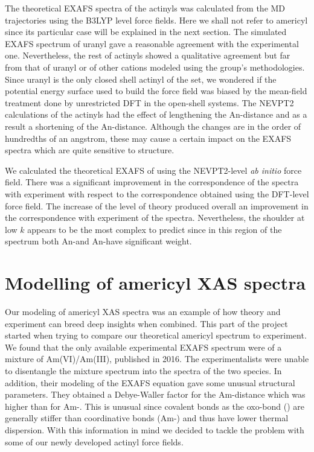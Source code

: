 The theoretical EXAFS spectra of the actinyls was calculated from the MD trajectories using the 
B3LYP level force fields. Here we shall not refer to americyl since its particular case will be 
explained in the next section. The simulated EXAFS spectrum of uranyl gave a reasonable agreement 
with the 
experimental one. Nevertheless, the rest of actinyls showed a qualitative agreement but far 
from that of 
uranyl or of other cations modeled using the group's methodologies. Since uranyl is the only closed 
shell actinyl of the set, we wondered if the potential energy surface used to build the force field 
was biased by the mean-field treatment done by unrestricted DFT in the open-shell systems. The 
NEVPT2 calculations of the actinyls had the effect of lengthening the An-\oyl distance and as a 
result a shortening of the An-\ofs distance. Although the changes are in the order of hundredths of 
an angstrom, these may cause a certain impact on the EXAFS spectra which are quite sensitive to 
structure. 

We calculated the theoretical EXAFS of \ce{[NpO2]^{+}} using the NEVPT2-level \textit{ab initio} 
force field. There was a significant improvement in the correspondence of the spectra with 
experiment with respect to the correspondence obtained using the DFT-level force field. The 
increase of the level of theory produced overall an improvement in the correspondence with 
experiment of the spectra. Nevertheless, the shoulder at low $k$ appears to be the most 
complex to predict since in this region of the spectrum both An-\oyl and An-\ofs have 
significant weight.

\section[Modelling of americyl XAS spectra]{Modelling of americyl XAS spectra}
Our modeling of americyl XAS spectra was an example of how theory and 
experiment can breed deep insights when combined. This part of the project started when trying 
to compare our theoretical americyl spectrum to experiment. We found that the only available 
experimental EXAFS spectrum were of a mixture of Am(VI)/Am(III), 
published in 2016.\cite{JRadioanNucChem_Riddle_2016} The experimentalists 
were unable to disentangle 
the mixture spectrum into the spectra of the two species. In addition, their modeling of the 
EXAFS equation gave some unusual structural parameters. They obtained a Debye-Waller factor for the 
Am-\oyl distance which was higher than for Am-\ofs. This is unusual since covalent bonds as the 
oxo-bond () 
are generally stiffer than coordinative bonds (Am-\ofs) and thus have lower thermal dispersion. 
With this information in mind we decided to tackle the problem with some of our newly developed 
actinyl force fields.


